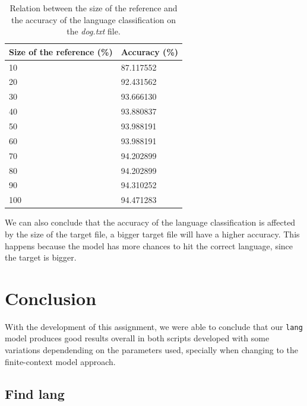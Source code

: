 \documentclass{article}
\begin{document}
\begin{table}
    \centering
    \begin{tabular}{|l|l|}
    \hline
        Size of the reference (\%) & Accuracy (\%) \\ \hline
        10 & 87.117552 \\ \hline
        20 & 92.431562 \\ \hline
        30 & 93.666130 \\ \hline
        40 & 93.880837 \\ \hline
        50 & 93.988191 \\ \hline
        60 & 93.988191 \\ \hline
        70 & 94.202899 \\ \hline
        80 & 94.202899 \\ \hline
        90 & 94.310252 \\ \hline
        100 & 94.471283 \\ \hline
    \end{tabular}
    \caption{Relation between the size of the reference and the accuracy of the language classification on the \textit{dog.txt} file.}
    \label{tab:rel_size_ref_acc_dog}
\end{table}

We can also conclude that the accuracy of the language classification is affected by the size of the target file, 
a bigger target file will have a higher accuracy.
This happens because the model has more chances to hit the correct language, since the target is bigger. %

\section{Conclusion}
\label{sec:conclusion}

With the development of this assignment, we were able to conclude that our \texttt{lang} model
produces good results overall in both scripts developed with some variations dependending on the
parameters used, specially when changing to the finite-context model approach.

\subsection{Find lang}
\label{subsec:conclusion:find_lang}
\end{document}
